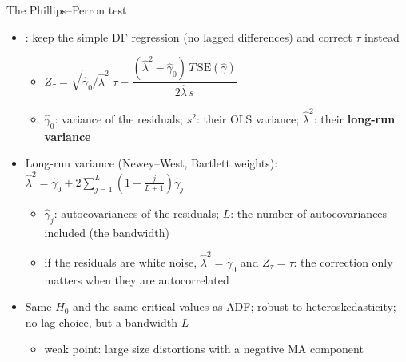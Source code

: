 \begin{frame}{The Phillips--Perron test}
\itemsize{\small}
\begin{itemize}
    \item {}: keep the simple DF regression (no lagged differences) and correct $\tau$ instead
    \begin{itemize}
        \item $Z_\tau = \sqrt{\hat\gamma_0/\hat\lambda^2}\;\tau - \dfrac{(\hat\lambda^2 - \hat\gamma_0)\,T\,\mathrm{SE}(\hat\gamma)}{2\hat\lambda\,s}$
        \item $\hat\gamma_0$: variance of the residuals; $s^2$: their OLS variance; $\hat\lambda^2$: their \textbf{long-run variance}
    \end{itemize}
    \item Long-run variance (Newey--West, Bartlett weights): $\hat\lambda^2 = \hat\gamma_0 + 2\sum_{j=1}^{L}(1 - \frac{j}{L+1})\hat\gamma_j$
    \begin{itemize}
        \item $\hat\gamma_j$: autocovariances of the residuals; $L$: the number of autocovariances included (the bandwidth)
        \item if the residuals are white noise, $\hat\lambda^2 = \hat\gamma_0$ and $Z_\tau = \tau$: the correction only matters when they are autocorrelated
    \end{itemize}
    \item Same $H_0$ and the same critical values as ADF; robust to heteroskedasticity; no lag choice, but a bandwidth $L$
    \begin{itemize}
        \item weak point: large size distortions with a negative MA component 
    \end{itemize}
\end{itemize}
\end{frame}

